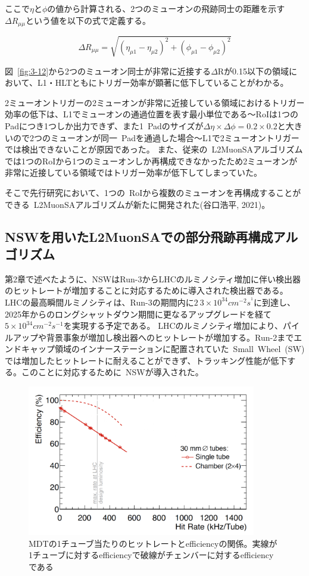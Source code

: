 ここで$\eta$と$\phi$の値から計算される、2つのミューオンの飛跡同士の距離を示す$\Delta R_{\mu\mu}$という値を以下の式で定義する。

\begin{equation}
    \Delta R_{\mu \mu}=\sqrt{\left(\eta_{\mu 1}-\eta_{\mu 2}\right)^2+\left(\phi_{\mu 1}-\phi_{\mu 2}\right)^2}
\end{equation}

図~\ref{fig:3-12}から2つのミューオン同士が非常に近接する$\Delta \mathrm{R}$が0.15以下の領域において、L1・HLTともにトリガー効率が顕著に低下していることがわかる。

2ミューオントリガーの2ミューオンが非常に近接している領域におけるトリガー効率の低下は、L1でミューオンの通過位置を表す最小単位である～RoIは1つのPadにつき1つしか出力できず、また1~Padのサイズが$\Delta\eta\times\Delta\phi=0.2\times0.2$と大きいので2つのミューオンが同一~Padを通過した場合～L1で2ミューオントリガーでは検出できないことが原因であった。
また、従来の~L2MuonSAアルゴリズムでは1つのRoIから1つのミューオンしか再構成できなかったため2ミューオンが非常に近接している領域ではトリガー効率が低下してしまっていた。

そこで先行研究\cite{article:taniguchi}において、1つの~RoIから複数のミューオンを再構成することができる~L2MuonSAアルゴリズムが新たに開発された(谷口浩平, 2021)。


\subsection{NSWを用いたL2MuonSAでの部分飛跡再構成アルゴリズム}\label{chapter3-3-2}
第2章で述べたように、NSWはRun-3からLHCのルミノシティ増加に伴い検出器のヒットレートが増加することに対応するために導入された検出器である。
LHCの最高瞬間ルミノシティは、Run-3の期間内に$2~3\times10^{34}cm^{-2}s^{^1}$に到達し、2025年からのロングシャットダウン期間に更なるアップグレードを経て$5\times10^{34}cm^{-2}s^{-1}$を実現する予定である。
LHCのルミノシティ増加により、パイルアップや背景事象が増加し検出器へのヒットレートが増加する。Run-2までエンドキャップ領域のインナーステーションに配置されていた~Small~Wheel~(SW)では増加したヒットレートに耐えることができず、トラッキング性能が低下する。このことに対応するために~NSWが導入された。

\begin{figure}[H]
    \centering
    \includegraphics[clip, width=10cm]{fig/3/NSW_HitRate.png}
    \caption{MDTの1チューブ当たりのヒットレートとefficiencyの関係。実線が1チューブに対するefficiencyで破線がチェンバーに対するefficiencyである\cite{article:ATLASNSWTDR}}
    \label{fig:3-14}
\end{figure}


